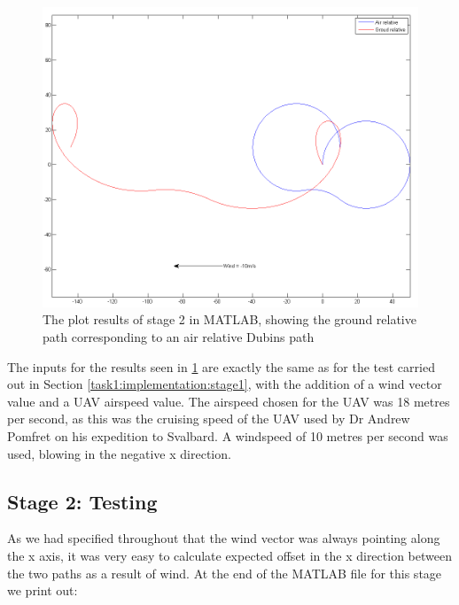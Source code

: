 \begin{figure}[htbp!] 
\centering    
\includegraphics[width=\textwidth]{PP2_Demo}
\caption[stage 2: Plotting the Effects of Wind on Dubins Paths in MATLAB]{The plot results of stage 2 in MATLAB, showing the ground relative path corresponding to an air relative Dubins path}
\label{fig:pp2demo}
\end{figure}

The inputs for the results seen in \ref{fig:pp2demo} are exactly the same as for the test carried out in Section \ref{task1:implementation:stage1}, with the addition of a wind vector value and a UAV airspeed value. The airspeed chosen for the UAV was 18 metres per second, as this was the cruising speed of the UAV used by Dr Andrew Pomfret on his expedition to Svalbard. A windspeed of 10 metres per second was used, blowing in the negative x direction.

\subsection{Stage 2: Testing}
\label{task1:stage2:testing}

As we had specified throughout that the wind vector was always pointing along the x axis, it was very easy to calculate expected offset in the x direction between the two paths as a result of wind. At the end of the MATLAB file for this stage we print out:

